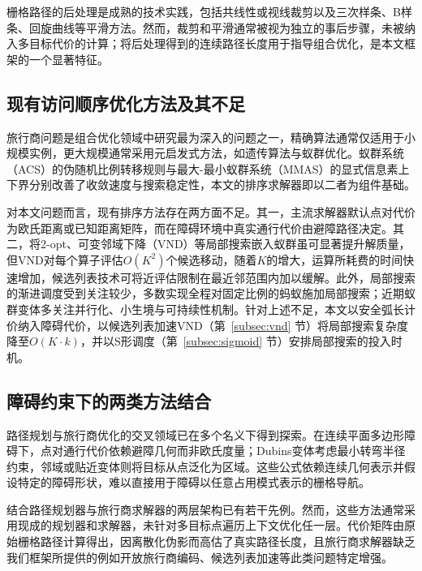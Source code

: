 \documentclass[lettersize,journal]{IEEEtran}
\begin{document}
栅格路径的后处理是成熟的技术实践，包括共线性或视线裁剪\textcolor{blue}{\cite{ref16}}以及三次样条、B样条、回旋曲线等平滑方法\textcolor{blue}{\cite{ref17,ref18,ref41}}。然而，裁剪和平滑通常被视为独立的事后步骤，未被纳入多目标代价的计算；将后处理得到的连续路径长度用于指导组合优化，是本文框架的一个显著特征。

\subsection{现有访问顺序优化方法及其不足}

旅行商问题是组合优化领域中研究最为深入的问题之一\textcolor{blue}{\cite{ref4,ref36}}，精确算法通常仅适用于小规模实例，更大规模通常采用元启发式方法，如遗传算法\textcolor{blue}{\cite{ref19}}与蚁群优化\textcolor{blue}{\cite{ref21,ref42}}。蚁群系统（ACS）的伪随机比例转移规则\textcolor{blue}{\cite{ref22}}与最大-最小蚁群系统（MMAS）的显式信息素上下界\textcolor{blue}{\cite{ref23}}分别改善了收敛速度与搜索稳定性，本文的排序求解器即以二者为组件基础。

对本文问题而言，现有排序方法存在两方面不足。其一，主流求解器默认点对代价为欧氏距离或已知距离矩阵，而在障碍环境中真实通行代价由避障路径决定。其二，将2-opt、可变邻域下降（VND）等局部搜索嵌入蚁群虽可显著提升解质量\textcolor{blue}{\cite{ref24,ref25,ref43}}，但VND对每个算子评估$O(K^2)$个候选移动，随着$K$的增大，运算所耗费的时间快速增加，候选列表技术可将近评估限制在最近邻范围内加以缓解\textcolor{blue}{\cite{ref26}}。此外，局部搜索的渐进调度受到关注较少，多数实现全程对固定比例的蚂蚁施加局部搜索；近期蚁群变体多关注并行化、小生境与可持续性机制\textcolor{blue}{\cite{ref27,ref28,ref29,ref30}}。针对上述不足，本文以安全弧长计价纳入障碍代价，以候选列表加速VND（第~\textcolor{blue}{\ref{subsec:vnd}} 节）将局部搜索复杂度降至$O(K \cdot k)$，并以S形调度（第~\textcolor{blue}{\ref{subsec:sigmoid}} 节）安排局部搜索的投入时机。

\subsection{障碍约束下的两类方法结合}

路径规划与旅行商优化的交叉领域已在多个名义下得到探索\textcolor{blue}{\cite{ref4,ref36}}。在连续平面多边形障碍下，点对通行代价依赖避障几何而非欧氏度量\textcolor{blue}{\cite{ref39}}；Dubins变体考虑最小转弯半径约束，邻域或贴近变体则将目标从点泛化为区域\textcolor{blue}{\cite{ref40}}。这些公式依赖连续几何表示并假设特定的障碍形状，难以直接用于障碍以任意占用模式表示的栅格导航。

结合路径规划器与旅行商求解器的两层架构已有若干先例\textcolor{blue}{\cite{ref1,ref2}}。然而，这些方法通常采用现成的规划器和求解器，未针对多目标点遍历上下文优化任一层。代价矩阵由原始栅格路径计算得出，因离散化伪影而高估了真实路径长度，且旅行商求解器缺乏我们框架所提供的例如开放旅行商编码、候选列表加速等此类问题特定增强。
\end{document}
